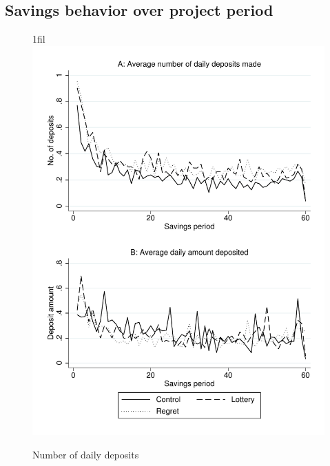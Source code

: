 \documentclass[11pt]{article}
\makeatletter
\newcommand*{\centerfloat}{%
  \parindent \z@
  \leftskip \z@ \@plus 1fil \@minus \textwidth
  \rightskip\leftskip
  \parfillskip \z@skip}
\makeatother
\begin{document}
	\clearpage

	\subsection{Savings behavior over project period}

		\begin{figure}[h]
		\centering
		\caption{Number of daily deposits}
		\centerfloat
		\includegraphics[width=\textwidth]{../../figures/line-deposits.pdf}
		\end{figure}
\end{document}
